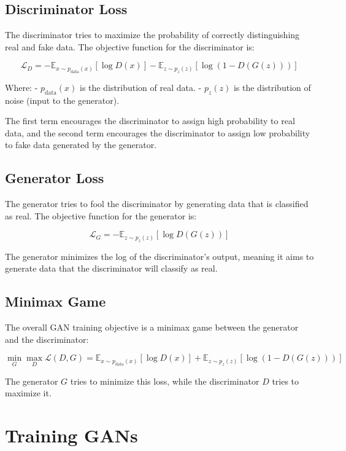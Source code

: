 \documentclass[
]{book}
\begin{document}
\subsection{Discriminator Loss}\label{discriminator-loss}

The discriminator tries to maximize the probability of correctly distinguishing real and fake data. The objective function for the discriminator is:

\[
\mathcal{L}_D = -\mathbb{E}_{x \sim p_{\text{data}}(x)}[\log D(x)] - \mathbb{E}_{z \sim p_z(z)}[\log(1 - D(G(z)))]
\]

Where:
- \(p_{\text{data}}(x)\) is the distribution of real data.
- \(p_z(z)\) is the distribution of noise (input to the generator).

The first term encourages the discriminator to assign high probability to real data, and the second term encourages the discriminator to assign low probability to fake data generated by the generator.

\subsection{Generator Loss}\label{generator-loss}

The generator tries to fool the discriminator by generating data that is classified as real. The objective function for the generator is:

\[
\mathcal{L}_G = -\mathbb{E}_{z \sim p_z(z)}[\log D(G(z))]
\]

The generator minimizes the log of the discriminator's output, meaning it aims to generate data that the discriminator will classify as real.

\subsection{Minimax Game}\label{minimax-game}

The overall GAN training objective is a minimax game between the generator and the discriminator:

\[
\min_G \max_D \mathcal{L}(D, G) = \mathbb{E}_{x \sim p_{\text{data}}(x)}[\log D(x)] + \mathbb{E}_{z \sim p_z(z)}[\log(1 - D(G(z)))]
\]

The generator \(G\) tries to minimize this loss, while the discriminator \(D\) tries to maximize it.

\section{Training GANs}\label{training-gans}
\end{document}
